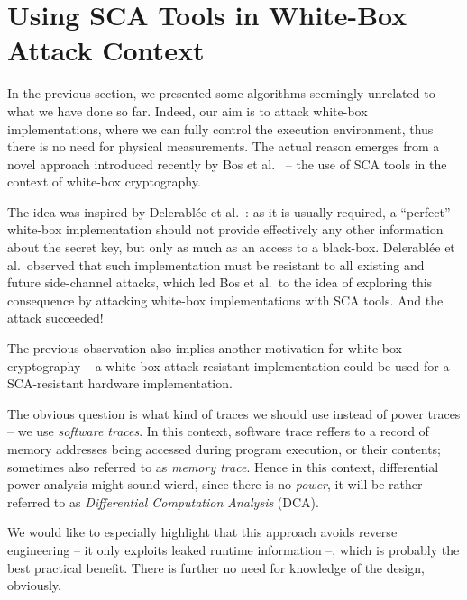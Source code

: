 \section{Using SCA Tools in White-Box Attack Context}
\label{sec:scawbc}

In the previous section, we presented some algorithms seemingly unrelated to what we have done so far. Indeed, our aim is to attack white-box implementations, where we can fully control the execution environment, thus there is no need for physical measurements. The actual reason emerges from a novel approach introduced recently by Bos et al.\ \cite{bos2015differential} -- the use of SCA tools in the context of white-box cryptography.

The idea was inspired by Delerabl{\'e}e et al.\ \cite{delerablee2013white}: as it is usually required, a ``perfect'' white-box implementation should not provide effectively any other information about the secret key, but only as much as an access to a black-box. Delerabl{\'e}e et al.\ observed that such implementation must be resistant to all existing and future side-channel attacks, which led Bos et al.\ to the idea of exploring this consequence by attacking white-box implementations with SCA tools. And the attack succeeded!

\begin{note}
\label{note:motiv}
	The previous observation also implies another motivation for white-box cryptography -- a white-box attack resistant implementation could be used for a SCA-resistant hardware implementation.
\end{note}

The obvious question is what kind of traces we should use instead of power traces -- we use {\em software traces}. In this context, software trace reffers to a record of memory addresses being accessed during program execution, or their contents; sometimes also referred to as {\em memory trace}. Hence in this context, differential power analysis might sound wierd, since there is no {\em power}, it will be rather referred to as {\em Differential Computation Analysis} (DCA).

\begin{remark}
\label{rem:benefit}   %
	We would like to especially highlight that this approach avoids reverse engineering -- it only exploits leaked runtime information --, which is probably the best practical benefit. There is further no need for knowledge of the design, obviously.
\end{remark}

